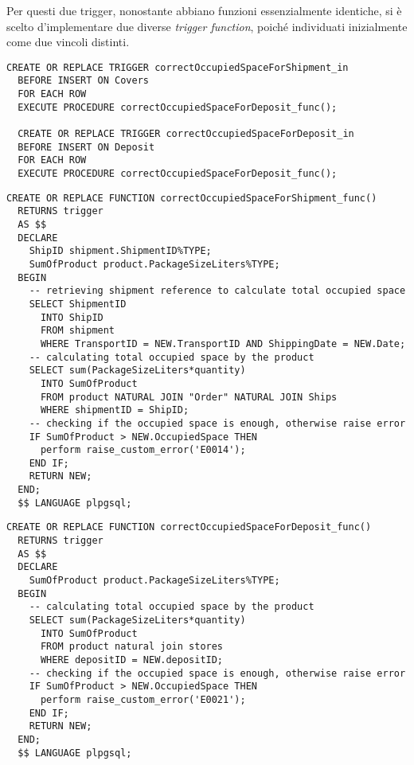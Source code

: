 Per questi due trigger, nonostante abbiano funzioni essenzialmente identiche, si è scelto d'implementare due diverse \textit{trigger function}, poiché individuati inizialmente come due vincoli distinti.

\begin{lstlisting}[caption={Trigger per i vincoli \textbf{correctOccupiedSpaceForShipment} e \textbf{correctOccupiedSpaceForDeposit}}]
  CREATE OR REPLACE TRIGGER correctOccupiedSpaceForShipment_in
  BEFORE INSERT ON Covers
  FOR EACH ROW
  EXECUTE PROCEDURE correctOccupiedSpaceForDeposit_func();

  CREATE OR REPLACE TRIGGER correctOccupiedSpaceForDeposit_in
  BEFORE INSERT ON Deposit
  FOR EACH ROW
  EXECUTE PROCEDURE correctOccupiedSpaceForDeposit_func();
\end{lstlisting}

\begin{lstlisting}[caption={Funzione per il vincolo \textbf{correctOccupiedSpaceForShipment}}]
  CREATE OR REPLACE FUNCTION correctOccupiedSpaceForShipment_func() 
  RETURNS trigger
  AS $$
  DECLARE
    ShipID shipment.ShipmentID%TYPE;
    SumOfProduct product.PackageSizeLiters%TYPE;
  BEGIN
    -- retrieving shipment reference to calculate total occupied space
    SELECT ShipmentID
      INTO ShipID
      FROM shipment
      WHERE TransportID = NEW.TransportID AND ShippingDate = NEW.Date;
    -- calculating total occupied space by the product
    SELECT sum(PackageSizeLiters*quantity)
      INTO SumOfProduct
      FROM product NATURAL JOIN "Order" NATURAL JOIN Ships
      WHERE shipmentID = ShipID;
    -- checking if the occupied space is enough, otherwise raise error
    IF SumOfProduct > NEW.OccupiedSpace THEN
      perform raise_custom_error('E0014');
    END IF;
    RETURN NEW;
  END;
  $$ LANGUAGE plpgsql;
\end{lstlisting}

\begin{lstlisting}[caption={Funzione per il vincolo \textbf{correctOccupiedSpaceForDeposit}}]
  CREATE OR REPLACE FUNCTION correctOccupiedSpaceForDeposit_func()
  RETURNS trigger
  AS $$
  DECLARE
    SumOfProduct product.PackageSizeLiters%TYPE;
  BEGIN
    -- calculating total occupied space by the product
    SELECT sum(PackageSizeLiters*quantity)
      INTO SumOfProduct
      FROM product natural join stores
      WHERE depositID = NEW.depositID;
    -- checking if the occupied space is enough, otherwise raise error
    IF SumOfProduct > NEW.OccupiedSpace THEN
      perform raise_custom_error('E0021');
    END IF;
    RETURN NEW;
  END;
  $$ LANGUAGE plpgsql;
\end{lstlisting}

